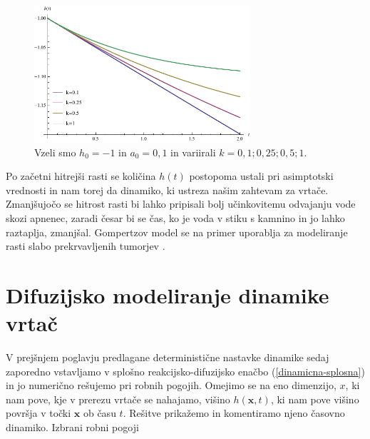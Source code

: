 \documentclass[a4paper, twoside, 12pt]{book}
\begin{document}
    \begin{figure}[h!]
      \begin{center}
        \includegraphics[width=8cm]{slike/gompertzova-rast}
      \end{center}
      \caption{Vzeli smo $h_0=-1$ in $a_0=0,1$ in variirali $k=0,1;0,25;0,5;1$.}
      \label{fig:gompertzova-rast}
    \end{figure}

Po začetni hitrejši rasti se količina $h(t)$ postopoma ustali pri asimptotski vrednosti in nam torej da dinamiko, ki ustreza našim zahtevam za vrtače. Zmanjšujočo se hitrost rasti bi lahko pripisali bolj učinkovitemu odvajanju vode skozi apnenec, zaradi česar bi se čas, ko je voda v stiku s kamnino in jo lahko raztaplja, zmanjšal.
Gompertzov model se na primer uporablja za modeliranje rasti slabo prekrvavljenih tumorjev \cite{wheldon1988mathematical}.

    \section{Difuzijsko modeliranje dinamike vrtač}

V prejšnjem poglavju predlagane deterministične nastavke dinamike sedaj zaporedno vstavljamo v splošno reakcijsko-difuzijsko enačbo (\ref{dinamicna-splosna}) in jo numerično rešujemo pri robnih pogojih. Omejimo se na eno dimenzijo, $x$, ki nam pove, kje v prerezu vrtače se nahajamo, višino $h(\mathbf{x},t)$, ki nam pove višino površja v točki $\mathbf{x}$ ob času $t$. Rešitve prikažemo in komentiramo njeno časovno dinamiko. Izbrani robni pogoji
\end{document}
